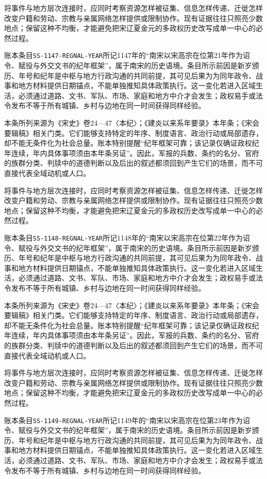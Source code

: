 将事件与地方层次连接时，应同时考察资源怎样被征集、信息怎样传递、迁徙怎样改变户籍和劳动、宗教与亲属网络怎样提供或限制协作。现有证据往往只照亮少数地点；保留这种不均衡，才能避免把宋辽夏金元的多政权历史改写成单一中心的必然过程。

账本条目\texttt{SS-1147-REGNAL-YEAR}所记1147年的“南宋以宋高宗在位第21年作为诏令、赋役与外交文书的纪年框架”，属于南宋的历史语境。条目所示前因是新岁颁历、年号和纪年是中枢与地方行政沟通的共同前提，其可见后果为为同年政令、战事和地方材料提供日期锚点，不能单独推知具体政策执行。这一变化若进入区域生活，必须通过道路、文书、军队、市场、家庭和地方中介才会发生；政权易手或法令发布不等于所有城镇、乡村与边地在同一时间获得同样经验。

本条所列来源为《宋史》卷24—47〈本纪〉；《建炎以来系年要录》本年条；《宋会要辑稿》相关门类。它们能够支持特定的年序、制度语言、政治行动或局部遗存，却不能无条件化为社会总量。账本特别提醒“纪年框架可靠；该记录仅确证政权纪年连续，年内具体事项须由本年条另证”。因此，军报的兵数、条约的名分、官府的族群分类、判牍中的道德判断以及后出的叙述都须回到产生它们的场景，而不可直接代表全域动机或人口。

将事件与地方层次连接时，应同时考察资源怎样被征集、信息怎样传递、迁徙怎样改变户籍和劳动、宗教与亲属网络怎样提供或限制协作。现有证据往往只照亮少数地点；保留这种不均衡，才能避免把宋辽夏金元的多政权历史改写成单一中心的必然过程。

账本条目\texttt{SS-1148-REGNAL-YEAR}所记1148年的“南宋以宋高宗在位第22年作为诏令、赋役与外交文书的纪年框架”，属于南宋的历史语境。条目所示前因是新岁颁历、年号和纪年是中枢与地方行政沟通的共同前提，其可见后果为为同年政令、战事和地方材料提供日期锚点，不能单独推知具体政策执行。这一变化若进入区域生活，必须通过道路、文书、军队、市场、家庭和地方中介才会发生；政权易手或法令发布不等于所有城镇、乡村与边地在同一时间获得同样经验。

本条所列来源为《宋史》卷24—47〈本纪〉；《建炎以来系年要录》本年条；《宋会要辑稿》相关门类。它们能够支持特定的年序、制度语言、政治行动或局部遗存，却不能无条件化为社会总量。账本特别提醒“纪年框架可靠；该记录仅确证政权纪年连续，年内具体事项须由本年条另证”。因此，军报的兵数、条约的名分、官府的族群分类、判牍中的道德判断以及后出的叙述都须回到产生它们的场景，而不可直接代表全域动机或人口。

将事件与地方层次连接时，应同时考察资源怎样被征集、信息怎样传递、迁徙怎样改变户籍和劳动、宗教与亲属网络怎样提供或限制协作。现有证据往往只照亮少数地点；保留这种不均衡，才能避免把宋辽夏金元的多政权历史改写成单一中心的必然过程。

账本条目\texttt{SS-1149-REGNAL-YEAR}所记1149年的“南宋以宋高宗在位第23年作为诏令、赋役与外交文书的纪年框架”，属于南宋的历史语境。条目所示前因是新岁颁历、年号和纪年是中枢与地方行政沟通的共同前提，其可见后果为为同年政令、战事和地方材料提供日期锚点，不能单独推知具体政策执行。这一变化若进入区域生活，必须通过道路、文书、军队、市场、家庭和地方中介才会发生；政权易手或法令发布不等于所有城镇、乡村与边地在同一时间获得同样经验。

